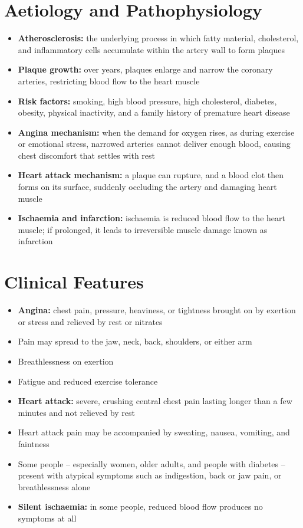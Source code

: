 \section*{Aetiology and Pathophysiology}
\begin{itemize}
    \item \textbf{Atherosclerosis:} the underlying process in which fatty material, cholesterol, and inflammatory cells accumulate within the artery wall to form plaques
    \item \textbf{Plaque growth:} over years, plaques enlarge and narrow the coronary arteries, restricting blood flow to the heart muscle
    \item \textbf{Risk factors:} smoking, high blood pressure, high cholesterol, diabetes, obesity, physical inactivity, and a family history of premature heart disease
    \item \textbf{Angina mechanism:} when the demand for oxygen rises, as during exercise or emotional stress, narrowed arteries cannot deliver enough blood, causing chest discomfort that settles with rest
    \item \textbf{Heart attack mechanism:} a plaque can rupture, and a blood clot then forms on its surface, suddenly occluding the artery and damaging heart muscle
    \item \textbf{Ischaemia and infarction:} ischaemia is reduced blood flow to the heart muscle; if prolonged, it leads to irreversible muscle damage known as infarction
\end{itemize}

\section*{Clinical Features}
\begin{itemize}
    \item \textbf{Angina:} chest pain, pressure, heaviness, or tightness brought on by exertion or stress and relieved by rest or nitrates
    \item Pain may spread to the jaw, neck, back, shoulders, or either arm
    \item Breathlessness on exertion
    \item Fatigue and reduced exercise tolerance
    \item \textbf{Heart attack:} severe, crushing central chest pain lasting longer than a few minutes and not relieved by rest
    \item Heart attack pain may be accompanied by sweating, nausea, vomiting, and faintness
    \item Some people -- especially women, older adults, and people with diabetes -- present with atypical symptoms such as indigestion, back or jaw pain, or breathlessness alone
    \item \textbf{Silent ischaemia:} in some people, reduced blood flow produces no symptoms at all
\end{itemize}

